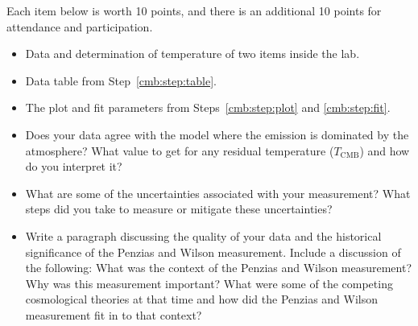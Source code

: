 Each item below is worth 10 points, and there is an additional 10 points for attendance and participation.

\begin{itemize}
	\item Data and determination of temperature of two items inside the lab.
	
	\item Data table from Step~\ref{cmb:step:table}.
	
	\item The plot and fit parameters from Steps~\ref{cmb:step:plot} and \ref{cmb:step:fit}.
	
	\item Does your data agree with the model where the emission is dominated by the atmosphere?  What value to get for any residual temperature ($T_\textrm{CMB}$) and how do you interpret it?
	
	\item What are some of the uncertainties associated with your measurement? What steps did you take to measure or mitigate these uncertainties?
	
	\item Write a paragraph discussing the quality of your data and the historical significance of the Penzias and Wilson measurement. Include a discussion of the following: What was the context of the Penzias and Wilson measurement? Why was this measurement important? What were some of the competing cosmological theories at that time and how did the Penzias and Wilson measurement fit in to that context?
\end{itemize}